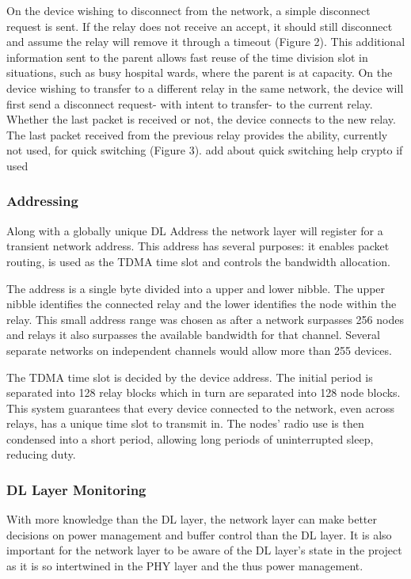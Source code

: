 On the device wishing to disconnect from the network, a simple disconnect request is sent. If the
relay does not receive an accept, it should still disconnect and assume the relay will remove it
through a timeout (Figure 2). This additional information sent to the parent allows fast reuse of the
time division slot in situations, such as busy hospital wards, where the parent is at capacity.
On the device wishing to transfer to a different relay in the same network, the device will first send a
disconnect request- with intent to transfer- to the current relay. Whether the last packet is received
or not, the device connects to the new relay. The last packet received from the previous relay
provides the ability, currently not used, for quick switching (Figure 3). {add about quick switching
help crypto if used}

\subsubsection{Addressing}
Along with a globally unique \ac{DL} Address the network layer will register for a transient network
address. This address has several purposes: it enables packet routing, is used as the \ac{TDMA} time slot
and controls the bandwidth allocation.


The address is a single byte divided into a upper and lower nibble. The upper nibble identifies the
connected relay and the lower identifies the node within the relay. This small address range was
chosen as after a network surpasses 256 nodes and relays it also surpasses the available bandwidth
for that channel. Several separate networks on independent channels would allow more than 255
devices.


The \ac{TDMA} time slot is decided by the device address. The initial period is separated into 128 relay
blocks which in turn are separated into 128 node blocks. This system guarantees that every device
connected to the network, even across relays, has a unique time slot to transmit in. The nodes’ radio
use is then condensed into a short period, allowing long periods of uninterrupted sleep, reducing
duty.


\subsubsection{\acf{DL} Layer Monitoring}
With more knowledge than the \ac{DL} layer, the network layer can make better decisions on power
management and buffer control than the \ac{DL} layer. It is also important for the network layer to be
aware of the \ac{DL} layer’s state in the project as it is so intertwined in the \ac{PHY} layer and the thus power
management.

